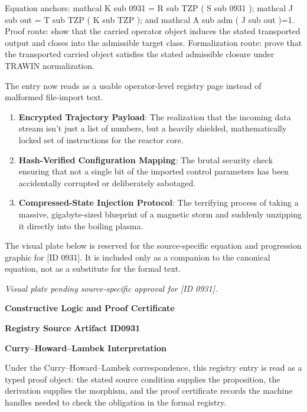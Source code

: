 Equation anchors: mathcal K sub 0931 = R sub TZP ( S sub 0931 ); mathcal J sub out = T sub TZP ( K sub TZP ); and mathcal A sub adm ( J sub out )=1. Proof route: show that the carried operator object induces the stated transported output and closes into the admissible target class. Formalization route: prove that the transported carried object satisfies the stated admissible closure under TRAWIN normalization.

The entry now reads as a usable operator-level registry page instead of malformed file-import text.
\endgroup

\begin{enumerate}[leftmargin=1.6em,itemsep=6pt,topsep=4pt]
\item \textbf{Encrypted Trajectory Payload}: The realization that the incoming data stream isn't just a list of numbers, but a heavily shielded, mathematically locked set of instructions for the reactor core.
\item \textbf{Hash-Verified Configuration Mapping}: The brutal security check ensuring that not a single bit of the imported control parameters has been accidentally corrupted or deliberately sabotaged.
\item \textbf{Compressed-State Injection Protocol}: The terrifying process of taking a massive, gigabyte-sized blueprint of a magnetic storm and suddenly unzipping it directly into the boiling plasma.
\end{enumerate}

\begingroup\footnotesize\sloppy
The visual plate below is reserved for the source-specific equation and progression graphic for [ID 0931]. It is included only as a companion to the canonical equation, not as a substitute for the formal text.
\par\endgroup
\begingroup\footnotesize\itshape
Visual plate pending source-specific approval for [ID 0931].
\par\endgroup

\clearpage
\begingroup\tzpsupportsetup
\noindent\textbf{\fontsize{10.8pt}{12.8pt}\selectfont [ID 0931] Constructive Logic and Proof Certificate}\par
\noindent\textbf{\fontsize{10pt}{12pt}\selectfont Registry Source Artifact ID0931}\par
\vspace{0.45em}
\begingroup
\footnotesize
\setlength{\parskip}{0.22em}
\setlength{\parindent}{0pt}
\noindent\textbf{Curry--Howard--Lambek Interpretation}\par
Under the Curry--Howard--Lambek correspondence, this registry entry is read as a typed proof
object: the stated source condition supplies the proposition, the derivation supplies the
morphism, and the proof certificate records the machine handles needed to check the obligation
in the formal registry.

